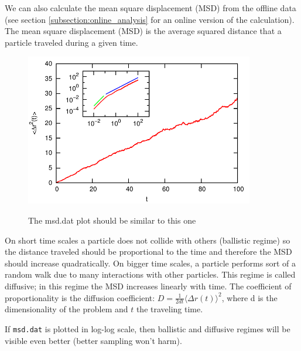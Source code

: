 \documentclass[
paper=a4,                       %
fontsize=11pt,                  %
twoside,                        %
footsepline,                    %
headsepline,                    %
headinclude=false,              %
footinclude=false,              %
pagesize,                       %
]{scrartcl}
\newtheorem{task}{Task}
\begin{document}
\newpage

We can also calculate the mean square displacement (MSD) from the offline data (see section \ref{subsection:online_analysis} for an online version of the calculation).
The mean square displacement (MSD) is the average squared distance that a particle traveled during a given time.

\vspace{1cm}
\vspace{1cm}

\begin{figure}[ht]
\begin{center}
\includegraphics[width=10cm]{figures/msd}
\label{ }
\caption{The msd.dat plot should be similar to this one}
\end{center}
\end{figure}

\noindent On short time scales a particle does not collide with others
(ballistic regime) so the distance traveled should be proportional to
the time and therefore the MSD should increase quadratically. On
bigger time scales, a particle performs sort of a random walk due to
many interactions with other particles. This regime is called
diffusive; in this regime the MSD increases linearly with time. The coefficient of
proportionality is the diffusion coefficient: $D=\frac{1}{2 d t} \langle
\Delta r(t) \rangle^2$, where d is the dimensionality of the problem and $t$ the
traveling time.

If \texttt{msd.dat} is plotted in log-log scale, then ballistic and diffusive regimes will be visible even better
(better sampling won't harm).



\end{document}
